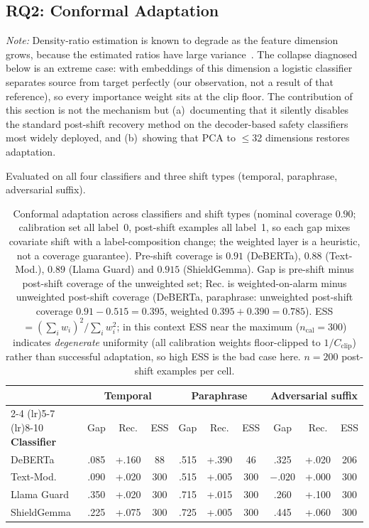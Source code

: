 \documentclass{article}
\begin{document}
\subsection{RQ2: Conformal Adaptation}
\label{sec:conformal-results}

\noindent\textit{Note:} Density-ratio estimation is known to degrade as the feature dimension grows, because the estimated ratios have large variance~\citep{stojanov2019lowdim}. The collapse diagnosed below is an extreme case: with embeddings of this dimension a logistic classifier separates source from target perfectly (our observation, not a result of that reference), so every importance weight sits at the clip floor. The contribution of this section is not the mechanism but (a)~documenting that it silently disables the standard post-shift recovery method on the decoder-based safety classifiers most widely deployed, and (b)~showing that PCA to $\leq$32 dimensions restores adaptation.

Evaluated on all four classifiers and three shift types (temporal, paraphrase, adversarial suffix).

\begin{table}[t]
\caption{Conformal adaptation across classifiers and shift types (nominal coverage $0.90$; calibration set all label~0, post-shift examples all label~1, so each gap mixes covariate shift with a label-composition change; the weighted layer is a heuristic, not a coverage guarantee). Pre-shift coverage is $0.91$ (DeBERTa), $0.88$ (Text-Mod.), $0.89$ (Llama Guard) and $0.915$ (ShieldGemma). Gap is pre-shift minus post-shift coverage of the unweighted set; Rec. is weighted-on-alarm minus unweighted post-shift coverage (DeBERTa, paraphrase: unweighted post-shift coverage $0.91-0.515=0.395$, weighted $0.395+0.390=0.785$). ESS $= (\sum_i w_i)^2 / \sum_i w_i^2$; in this context ESS near the maximum ($n_{\text{cal}}{=}300$) indicates \emph{degenerate} uniformity (all calibration weights floor-clipped to $1/C_{\text{clip}}$) rather than successful adaptation, so high ESS is the bad case here. $n{=}200$ post-shift examples per cell.}
\label{tab:conformal}
\centering
\small
\begin{tabular}{l ccc ccc ccc}
\toprule
& \multicolumn{3}{c}{\textbf{Temporal}} & \multicolumn{3}{c}{\textbf{Paraphrase}} & \multicolumn{3}{c}{\textbf{Adversarial suffix}} \\
\cmidrule(lr){2-4} \cmidrule(lr){5-7} \cmidrule(lr){8-10}
\textbf{Classifier} & Gap & Rec. & ESS & Gap & Rec. & ESS & Gap & Rec. & ESS \\
\midrule
DeBERTa & .085 & +.160 & 88 & .515 & +.390 & 46 & .325 & +.020 & 206 \\
Text-Mod. & .090 & +.020 & 300 & .515 & +.005 & 300 & $-.020$ & +.000 & 300 \\
Llama Guard & .350 & +.020 & 300 & .715 & +.015 & 300 & .260 & +.100 & 300 \\
ShieldGemma & .225 & +.075 & 300 & .725 & +.005 & 300 & .445 & +.060 & 300 \\
\bottomrule
\end{tabular}
\end{table}
\end{document}

